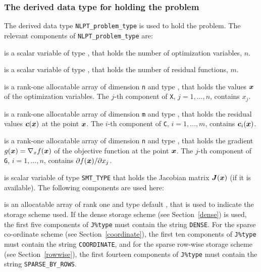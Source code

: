 \documentclass{galahad}
\begin{document}

\subsubsection{The derived data type for holding the problem}\label{typeprob}
The derived data type {\tt NLPT\_problem\_type} is used to hold
the problem. The relevant components of
{\tt NLPT\_problem\_type}
are:

\begin{description}

 is a scalar variable of type \integer,
 that holds the number of optimization variables, $n$.

 is a scalar variable of type \integer,
 that holds the number of residual functions, $m$.



 is a rank-one allocatable array of dimension {\tt n} and type
\realdp, that holds the values ${\bm{x}}$ of the optimization variables.
The $j$-th component of {\tt X}, $j = 1,  \ldots , n$, contains $x_{j}$.

 is a rank-one allocatable array of dimension {\tt m} and type
\realdp, that holds the residual values ${\bm{c}}({\bm{x}})$
at the point ${\bm{x}}$. The $i$-th component of
{\tt C}, $i = 1, \ldots, m$, contains ${\bm{c}}_{i}({\bm{x}})$.

 is a rank-one allocatable array of dimension {\tt n} and type
\realdp, that holds the gradient $g({\bm{x}}) = \nabla_x f({\bm{x}})$ of the
objective function at the point ${\bm{x}}$. The $j$-th component of
{\tt G}, $i = 1, \ldots, n$, contains $\partial f({\bm{x}})/\partial x_j$.

 is scalar variable of type {\tt SMT\_TYPE}
that holds the Jacobian matrix ${\bm{J}}({\bm{x}})$ (if it is available).
The following components are used here:

\begin{description}

 is an allocatable array of rank one and type default
\character, that
is used to indicate the storage scheme used. If the dense storage scheme
(see Section~\ref{dense}) is used,
the first five components of {\tt J\%type} must contain the
string {\tt DENSE}.
For the sparse co-ordinate scheme (see Section~\ref{coordinate}),
the first ten components of {\tt J\%type} must contain the
string {\tt COORDINATE},
and for the sparse row-wise storage scheme (see Section~\ref{rowwise}),
the first fourteen components of {\tt J\%type} must contain the
string {\tt SPARSE\_BY\_ROWS}.


\end{description}
\end{description}
\end{document}
